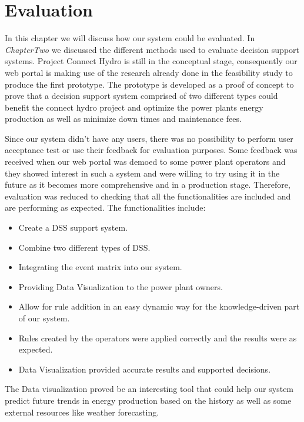 \chapter{Evaluation}
\label{ChapterSix}
In this chapter we will discuss how our system could be evaluated. In \textit{ChapterTwo} we discussed the different methods used to evaluate decision support systems. Project Connect Hydro is still in the conceptual stage, consequently our web portal is making use of the research already done in the feasibility study to produce the first prototype. The prototype is developed as a proof of concept to prove that a decision support system comprised of two different types could benefit the connect hydro project and optimize the power plants energy production as well as minimize down times and maintenance fees.

Since our system didn't have any users, there was no possibility to perform user acceptance test or use their feedback for evaluation purposes. Some feedback was received when our web portal was demoed to some power plant operators and they showed interest in such a system and were willing to try using it in the future as it becomes more comprehensive and in a production stage. Therefore, evaluation was reduced to checking that all the functionalities are included and are performing as expected. The functionalities include:
\begin{itemize}
	\item Create a DSS support system.
	\item Combine two different types of DSS.
	\item Integrating the event matrix into our system.
	\item Providing Data Visualization to the power plant owners.
	\item Allow for rule addition in an easy dynamic way for the knowledge-driven part of our system.
	\item Rules created by the operators were applied correctly and the results were as expected.
	\item Data Visualization provided accurate results and supported decisions.
\end{itemize}
The Data visualization proved be an interesting tool that could help our system predict future trends in energy production based on the history as well as some external resources like weather forecasting.

